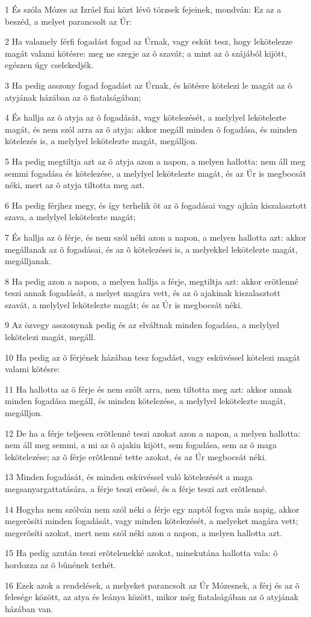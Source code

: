 \par 1 És szóla Mózes az Izráel fiai közt lévõ törzsek fejeinek, mondván: Ez az a beszéd, a melyet parancsolt az Úr:
\par 2 Ha valamely férfi fogadást fogad az Úrnak, vagy esküt tesz, hogy lekötelezze magát valami kötésre: meg ne szegje az õ szavát; a mint az õ szájából kijött, egészen úgy cselekedjék.
\par 3 Ha pedig asszony fogad fogadást az Úrnak, és kötésre kötelezi le magát az õ atyjának házában az õ fiatalságában;
\par 4 És hallja az õ atyja az õ fogadását, vagy kötelezését, a melylyel lekötelezte magát, és nem szól arra az õ atyja: akkor megáll minden õ fogadása, és minden kötelezés is, a melylyel lekötelezte magát, megálljon.
\par 5 Ha pedig megtiltja azt az õ atyja azon a napon, a melyen hallotta: nem áll meg semmi fogadása és kötelezése, a melylyel lekötelezte magát, és az Úr is megbocsát néki, mert az õ atyja tiltotta meg azt.
\par 6 Ha pedig férjhez megy, és így terhelik õt az õ fogadásai vagy ajkán kiszalasztott szava, a melylyel lekötelezte magát;
\par 7 És hallja az õ férje, és nem szól néki azon a napon, a melyen hallotta azt: akkor megállanak az õ fogadásai, és az õ kötelezései is, a melyekkel lekötelezte magát, megálljanak.
\par 8 Ha pedig azon a napon, a melyen hallja a férje, megtiltja azt: akkor erõtlenné teszi annak fogadását, a melyet magára vett, és az õ ajakinak kiszalasztott szavát, a melylyel lekötelezte magát; és az Úr is megbocsát néki.
\par 9 Az özvegy asszonynak pedig és az elváltnak minden fogadása, a melylyel lekötelezi magát, megáll.
\par 10 Ha pedig az õ férjének házában tesz fogadást, vagy esküvéssel kötelezi magát valami kötésre:
\par 11 Ha hallotta az õ férje és nem szólt arra, nem tiltotta meg azt: akkor annak minden fogadása megáll, és minden kötelezése, a melylyel lekötelezte magát, megálljon.
\par 12 De ha a férje teljesen erõtlenné teszi azokat azon a napon, a melyen hallotta: nem áll meg semmi, a mi az õ ajakin kijött, sem fogadása, sem az õ maga lekötelezése; az õ férje erõtlenné tette azokat, és az Úr megbocsát néki.
\par 13 Minden fogadását, és minden esküvéssel való kötelezését a maga megsanyargattatására, a férje teszi erõssé, és a férje teszi azt erõtlenné.
\par 14 Hogyha nem szólván nem szól néki a férje egy naptól fogva más napig, akkor megerõsíti minden fogadását, vagy minden kötelezését, a melyeket magára vett; megerõsíti azokat, mert nem szól néki azon a napon, a melyen hallotta azt.
\par 15 Ha pedig azután teszi erõtelenekké azokat, minekutána hallotta vala: õ hordozza az õ bûnének terhét.
\par 16 Ezek azok a rendelések, a melyeket parancsolt az Úr Mózesnek, a férj és az õ felesége között, az atya és leánya között, mikor még fiatalságában az õ atyjának házában van.

